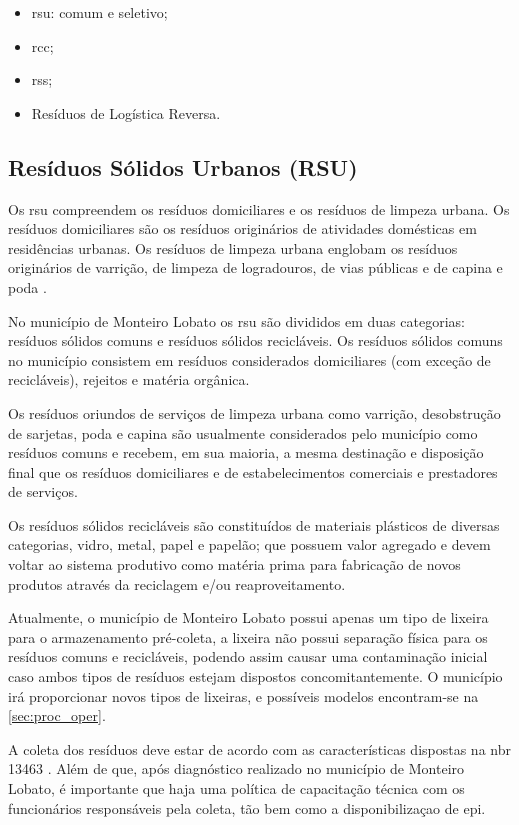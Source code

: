 \begin{itemize}
	\item \gls{rsu}: comum e seletivo;
	\item \gls{rcc};
	\item \gls{rss};
	\item Resíduos de Logística Reversa.
\end{itemize}

	\subsection{Resíduos Sólidos Urbanos (RSU)}
	Os \gls{rsu} compreendem os resíduos domiciliares e os resíduos de limpeza urbana. Os resíduos domiciliares são os resíduos originários de atividades domésticas em residências urbanas. Os resíduos de limpeza urbana englobam os resíduos originários de varrição, de limpeza de logradouros, de vias públicas e de capina e poda \cite{brasil:12305, brasil:11445}.
	
	No município de Monteiro Lobato os \gls{rsu} são divididos em duas categorias: resíduos sólidos comuns e resíduos sólidos recicláveis. Os resíduos sólidos comuns no município consistem em resíduos considerados domiciliares (com exceção de recicláveis), rejeitos e matéria orgânica.
	
	Os resíduos oriundos de serviços de limpeza urbana como varrição, desobstrução de sarjetas, poda e capina são usualmente considerados pelo município como resíduos comuns e recebem, em sua maioria, a mesma destinação e disposição final que os resíduos domiciliares e de estabelecimentos comerciais e prestadores de serviços.
	
	Os resíduos sólidos recicláveis são constituídos de materiais plásticos de diversas categorias, vidro, metal, papel e papelão; que possuem valor agregado e devem voltar ao sistema produtivo como matéria prima para fabricação de novos produtos através da reciclagem e/ou reaproveitamento.
	
	Atualmente, o município de Monteiro Lobato possui apenas um tipo de lixeira para o armazenamento pré-coleta, a lixeira não possui separação física para os resíduos comuns e recicláveis, podendo assim causar uma contaminação inicial caso ambos tipos de resíduos estejam dispostos concomitantemente. O município irá proporcionar novos tipos de lixeiras, e possíveis modelos encontram-se na \autoref{sec:proc_oper}.
	
	A coleta dos resíduos deve estar de acordo com as características dispostas na \gls{nbr} 13463 \cite{abnt:13463:1995}. Além de que, após diagnóstico realizado no município de Monteiro Lobato, é importante que haja uma política de capacitação técnica com os funcionários responsáveis pela coleta, tão bem como a disponibilizaçao de \gls{epi}. 
	
